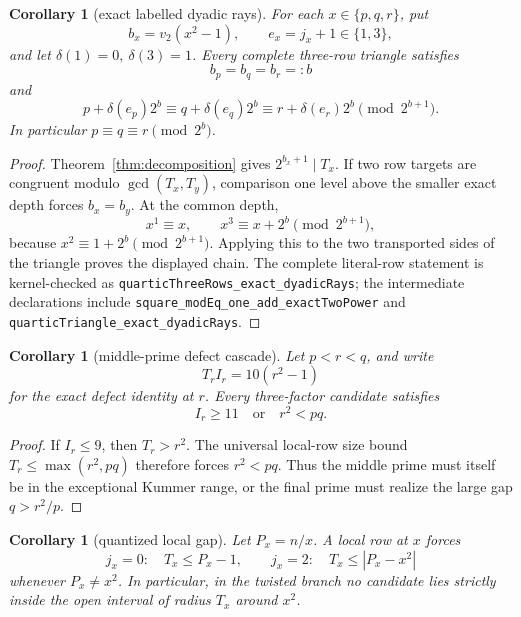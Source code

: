 \documentclass[11pt]{amsart}
\newtheorem{corollary}[theorem]{Corollary}
\theoremstyle{definition}
\theoremstyle{remark}
\begin{document}
\begin{corollary}[exact labelled dyadic rays]\label{cor:dyadic-rays}
For each \(x\in\{p,q,r\}\), put
\[
 b_x=v_2(x^2-1),\qquad e_x=j_x+1\in\{1,3\},
\]
and let \(\delta(1)=0,\ \delta(3)=1\).  Every complete three-row triangle
satisfies
\[
 b_p=b_q=b_r=:b
\]
and
\[
 p+\delta(e_p)2^b
 \equiv q+\delta(e_q)2^b
 \equiv r+\delta(e_r)2^b
 \pmod{2^{b+1}}.
\]
In particular \(p\equiv q\equiv r\pmod{2^b}\).
\end{corollary}

\begin{proof}
Theorem~\ref{thm:decomposition} gives
\(2^{b_x+1}\mid T_x\).  If two row targets are congruent modulo
\(\gcd(T_x,T_y)\), comparison one level above the smaller exact depth
forces \(b_x=b_y\).  At the common depth,
\[
 x^1\equiv x,\qquad x^3\equiv x+2^b\pmod{2^{b+1}},
\]
because \(x^2\equiv1+2^b\pmod{2^{b+1}}\).  Applying this to the two
transported sides of the triangle proves the displayed chain.
The complete literal-row statement is kernel-checked as
\texttt{quarticThreeRows\_\allowbreak exact\_\allowbreak dyadicRays}; the
intermediate declarations include
\texttt{square\_\allowbreak modEq\_\allowbreak one\_\allowbreak add\_\allowbreak exactTwoPower}
and
\texttt{quarticTriangle\_\allowbreak exact\_\allowbreak dyadicRays}.
\end{proof}

\begin{corollary}[middle-prime defect cascade]\label{cor:defect-cascade}
Let \(p<r<q\), and write
\[
T_r I_r=10(r^2-1)
\]
for the exact defect identity at \(r\).  Every three-factor candidate
satisfies
\[
\boxed{I_r\ge11\quad\text{or}\quad r^2<pq.}
\]
\end{corollary}

\begin{proof}
If \(I_r\le9\), then \(T_r>r^2\).  The universal local-row size bound
\(T_r\le\max(r^2,pq)\) therefore forces \(r^2<pq\).  Thus the middle
prime must itself be in the exceptional Kummer range, or the final prime
must realize the large gap \(q>r^2/p\).
\end{proof}

\begin{corollary}[quantized local gap]\label{cor:quantized-gap}
Let \(P_x=n/x\).  A local row at \(x\) forces
\[
 j_x=0:\quad T_x\le P_x-1,
 \qquad
 j_x=2:\quad T_x\le |P_x-x^2|
\]
whenever \(P_x\ne x^2\).  In particular, in the twisted branch no
candidate lies strictly inside the open interval of radius \(T_x\)
around \(x^2\).
\end{corollary}
\end{document}
